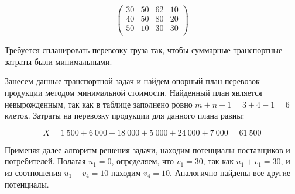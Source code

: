 \documentclass[a4paper,12pt]{article}
\begin{document}
	\[
		\begin{pmatrix}
			30 & 50 & 62 & 10 \\
			40 & 50 & 80 & 20 \\
			50 & 10 & 30 & 30 \\
		\end{pmatrix}
	\]
	
	Требуется спланировать перевозку груза так, чтобы суммарные транспортные затраты были минимальными.
	
	Занесем данные транспортной задач и найдем опорный план перевозок продукции методом минимальной стоимости. Найденный план является невырожденным, так как в таблице заполнено ровно $m + n - 1 = 3 + 4 - 1 = 6$ клеток. Затраты на перевозку продукции для данного плана равны:
	
	\[
		X = 1 \ 500 + 6 \ 000 + 18 \ 000 + 5 \ 000 + 24 \ 000 + 7 \ 000 = 61 \ 500
	\]
	
	Применяя далее алгоритм решения задачи, находим потенциалы поставщиков и потребителей. Полагая $u_1 = 0$, определяем, что $v_1 = 30$, так как $u_1 + v_1 = 30$, и из соотношения $u_1 + v_4 = 10$ находим $v_4 = 10$. Аналогично найдены все другие потенциалы.
	
\end{document}
